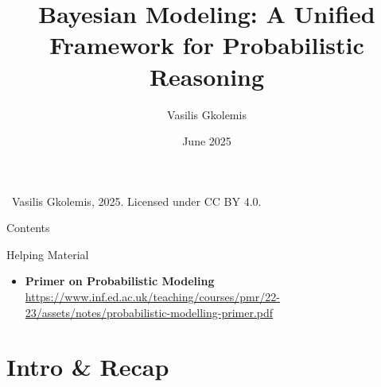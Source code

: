 \documentclass{beamer}
\title{Bayesian Modeling: A Unified Framework for Probabilistic Reasoning}
\author{Vasilis Gkolemis}
\institute{ATHENA RC | HUA}
\date{June 2025}
\begin{document}

\begin{frame}
  \titlepage
  \vfill
  \footnotesize
  \textcopyright\
  Vasilis Gkolemis, 2025. Licensed under CC BY 4.0.
\end{frame}

\begin{frame}{Contents}
  \tableofcontents
\end{frame}


\begin{frame}{Helping Material}
  \begin{itemize}
    \item \textbf{Primer on Probabilistic Modeling} \url{https://www.inf.ed.ac.uk/teaching/courses/pmr/22-23/assets/notes/probabilistic-modelling-primer.pdf}
  \end{itemize}
\end{frame}


\section{Intro \& Recap}
\end{document}
